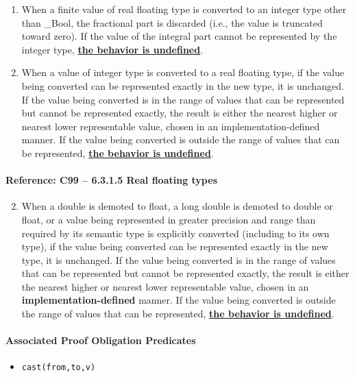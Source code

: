 \documentclass[11pt]{article}
\begin{document}
\begin{enumerate}
\item When a finite value of real floating type is converted to an integer type 
other than \_Bool, the fractional part is discarded (i.e., the value is 
truncated toward zero). If the value of the integral part cannot be represented 
by the integer type, \underline{\bf the behavior is undefined}.
\item When a value of integer type is converted to a real floating type, if the value 
being converted can be represented exactly in the new type, it is unchanged. If 
the value being converted is in the range of values that can be represented but 
cannot be represented exactly, the result is either the nearest higher or nearest 
lower representable value, chosen in an implementation-defined manner. If the 
value being converted is outside the range of values that can be represented, 
\underline{\bf the behavior is undefined}.
\end{enumerate}

\paragraph{Reference: C99 -- 6.3.1.5 Real floating types}
\begin{enumerate}
\setcounter{enumi}{1}
\item
When a double is demoted to float, a long double is demoted to double or float, 
or a value being represented in greater precision and range than required by 
its semantic type is explicitly converted (including to its own type), 
if the value being converted can be represented exactly in the new type, it is 
unchanged. If the value being converted is in the range of values that can be 
represented but cannot be represented exactly, the result is either the nearest 
higher or nearest lower representable value, chosen in an 
{\bf implementation-defined} manner. If the value being converted is outside the range 
of values that can be represented, \underline{\bf the behavior is undefined}.
\end{enumerate}

\paragraph{Associated Proof Obligation Predicates}
\begin{itemize}
\item {\tt cast(from,to,v)}
\end{itemize}
\end{document}
